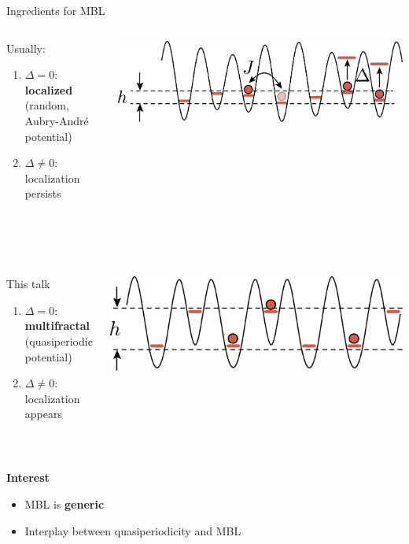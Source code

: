\begin{frame}{Ingredients for MBL}
\begin{columns}
\begin{column}{0.65\textwidth}
Usually:
\begin{enumerate}
	\item $\Delta=0$: \textbf{localized} (random, Aubry-André potential)
	\item $\Delta \neq 0$: localization persists
\end{enumerate}
\end{column}
\begin{column}{0.35\textwidth}
\centering
\includegraphics[width=\textwidth]{img/2_MBL/XXZ_cold_atoms}
\end{column}
\end{columns}
~\\
~\\

\begin{columns}
\begin{column}{0.65\textwidth}
This talk
\begin{enumerate}
	\item $\Delta=0$: \textbf{multifractal} (quasiperiodic potential)
	\item $\Delta\neq0$: localization appears
\end{enumerate}
\end{column}
\begin{column}{0.35\textwidth}
\centering
\includegraphics[width=\textwidth]{img/2_MBL/XXZ_QP_cold_atoms}
\end{column}
\end{columns}
~\\

\begin{block}{\textbf{Interest}}
\begin{itemize}
	\item MBL is \textbf{generic}
	\item Interplay between quasiperiodicity and MBL
\end{itemize}
\end{block}

\end{frame}